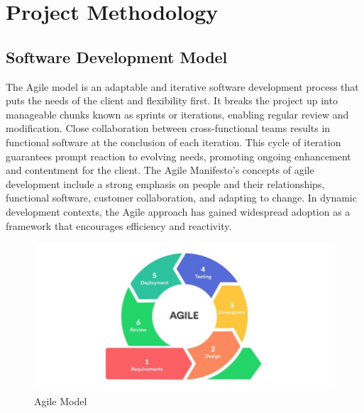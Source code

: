 \chapter{Project Methodology}
 \section{Software Development Model}
 The Agile model is an adaptable and iterative software development process that puts the needs of the client and flexibility first. It breaks the project up into manageable chunks known as sprints or iterations, enabling regular review and modification. Close collaboration between cross-functional teams results in functional software at the conclusion of each iteration. This cycle of iteration guarantees prompt reaction to evolving needs, promoting ongoing enhancement and contentment for the client. The Agile Manifesto's concepts of agile development include a strong emphasis on people and their relationships, functional software, customer collaboration, and adapting to change. In dynamic development contexts, the Agile approach has gained widespread adoption as a framework that encourages efficiency and reactivity.
 \begin{figure}[h]
	\centering
	\includegraphics[scale=0.6]{images/Agile_model.png}
	\caption{Agile Model}
	
	\end{figure}
	
\pagebreak

	
	
	

